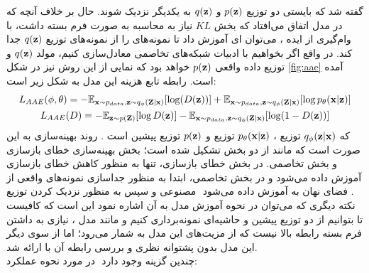 گفته شد که بایستی دو توزیع $p({\bf z})$ و $q({\bf z})$ به یکدیگر نزدیک شوند. حال بر خلاف آنچه که در مدل \vae{} اتفاق می‌افتاد که بخش $KL$ نیاز به محاسبه به صورت فرم بسته داشت، با وام‌گیری از ایده \gan{}، می‌توان \discriminator ‌ای آموزش داد تا نمونه‌های \priordist{} را از نمونه‌های توزیع \marginal
$q({\bf z})$
جدا کند. در واقع اگر بخواهیم با ادبیات شبکه‌های تخاصمی معادل‌سازی کنیم، مولد $q({\bf z})$ و توزیع داده واقعی $p({\bf z})$ خواهد بود که نمایی از این روش نیز در شکل \ref{fig:aae} آمده است. رابطه تابع هزینه این مدل به شکل زیر است:
\begin{gather}
	L_{AAE}(\phi, \theta) =
	- \mathbb E_{{\bf x} \sim p_{data}, {\bf z} \sim q_\phi({\bf Z}|{\bf x})} [\log (D({\bf z}))]
	+ \mathbb E_{{\bf x} \sim p_{data}, {\bf z} \sim q_\phi({\bf Z}|{\bf x})}[\log p_\theta({\bf x}|{\bf z})]\\
	L_{AAE}(D) =
	- \mathbb E_{{\bf z} \sim p({\bf Z})} [\log D({\bf z})]
	- \mathbb E_{{\bf x} \sim p_{data},{\bf z} \sim q_\phi({\bf Z}|{\bf x})} [\log (1 - D({\bf z}))]
\end{gather}
که $q_\phi({\bf z}|{\bf x})$ توزیع \encoder{}،
$p_\theta({\bf x}|{\bf z})$
توزیع \decoder{} و $p({\bf z})$ توزیع پیشین است \cite{aae}. روند بهینه‌سازی به این صورت است که مانند \gan{} از دو بخش تشکیل شده است؛ بخش بهینه‌سازی خطای بازسازی و بخش تخاصمی. در بخش خطای بازسازی، تنها \autoencoder{} به منظور کاهش خطای بازسازی آموزش داده می‌شود و در بخش تخاصمی، ابتدا \discriminator{} به منظور جداسازی نمونه‌های واقعی از مصنوعی و سپس \encoder{} به منظور نزدیک کردن توزیع \marginal{}‎ فضای نهان به \priordist{} آموزش داده می‌شود \cite{aae}.\\
نکته دیگری که می‌توان در نحوه آموزش مدل به آن اشاره نمود این است که کافیست تا بتوانیم از دو توزیع پیشین و حاشیه‌ای \encoder{} نمونه‌برداری کنیم و مانند مدل \vae{}، نیازی به داشتن فرم بسته رابطه بالا نیست که از مزیت‌های این مدل به شمار می‌رود؛ اما از سوی دیگر این مدل بدون پشتوانه نظری و بررسی رابطه آن با \likelihood{} ارائه شد.\\
در مورد نحوه عملکرد ‎\encoder{}‎ چندین گزینه وجود دارد:
